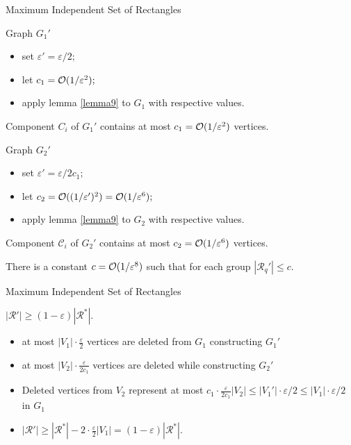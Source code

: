 \documentclass[handout,usenames,dvipsnames]{beamer}
\begin{document}
\begin{frame}{Maximum Independent Set of Rectangles}
    \begin{minipage}{0.45\textwidth}
    \begin{block}{Graph $G_1'$}
        \begin{itemize}
            \item set $\varepsilon' = \varepsilon/2;$
            \item let $c_1 = \mathcal{O}(1/\varepsilon^2);$
            \item apply lemma \ref{lemma9} to $G_1$ with respective values.
        \end{itemize} 
    \end{block}
    \pause
        Component $C_i$ of $G_1'$ contains at most $c_1 = \mathcal{O}(1/\varepsilon^2)$ vertices.
    \end{minipage}\hfill
    \begin{minipage}{0.45\textwidth}
        \begin{block}{Graph $G_2'$}
    \begin{itemize}
        \item set $\varepsilon' = \varepsilon/2c_1;$
        \item let $c_2 = \mathcal{O}((1/\varepsilon')^2) = \mathcal{O}(1/\varepsilon^6);$
        \item apply lemma \ref{lemma9} to $G_2$ with respective values.
    \end{itemize}
    \end{block}
    \pause
    Component $\mathcal C_i$ of $G_2'$ contains at most $c_2 = \mathcal{O}(1/\varepsilon^6)$ vertices. 
    \end{minipage}
    \pause
    \begin{lm}
        \label{lemma12}
        There is a constant $c = \mathcal{O}(1/\varepsilon^8)$ such that for each group $|\mathcal R_q'| \leqslant c.$
    \end{lm}
\end{frame}

\begin{frame}{Maximum Independent Set of Rectangles}
    \begin{lm}
        \label{lemma13}
        $|\mathcal R'| \geqslant (1 - \varepsilon)|\mathcal R^*|.$
    \end{lm}
    \pause
    \begin{itemize}
        \item at most $|V_1| \cdot \frac\varepsilon2$ vertices are deleted from $G_1$ constructing $G_1'$
        \pause
        \item at most $|V_2| \cdot \frac{\varepsilon}{2c_1}$ vertices are deleted while constructing $G_2'$
        \pause
        \item Deleted vertices from $V_2$ represent at most $c_1 \cdot \frac{\varepsilon}{2c_1}|V_2| \leqslant |V_1'|\cdot \varepsilon/2 \leqslant |V_1| \cdot \varepsilon/2$ in $G_1$
        \pause
        \item $|\mathcal R'| \geqslant |\mathcal R^*| - 2 \cdot \frac{\varepsilon}{2}|V_1| = (1 - \varepsilon)|\mathcal R^*|.$
    \end{itemize}
\end{frame}
\end{document}
